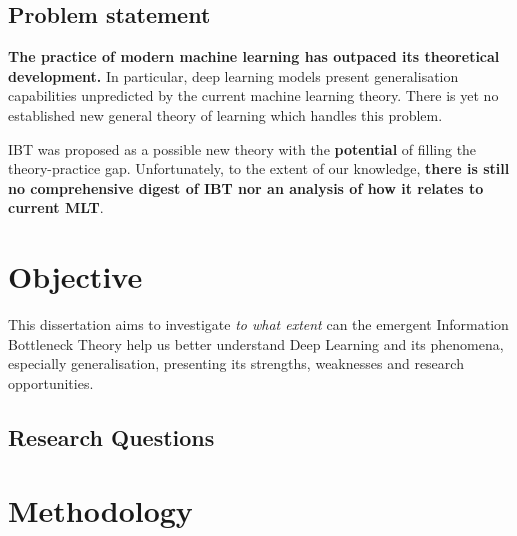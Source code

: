 \documentclass[
  letterpaper,
  a4paper,
  12pt,
  twoside,
  brazil,
  british,
  open=right]{scrbook}
\begin{document}
\hypertarget{problem-statement}{%
\subsection{Problem statement}\label{problem-statement}}

\textbf{The practice of modern machine learning has outpaced its
theoretical development.} In particular, deep learning models present
generalisation capabilities unpredicted by the current machine learning
theory. There is yet no established new general theory of learning which
handles this problem.

{IBT} was proposed as a possible new theory with the \textbf{potential}
of filling the theory-practice gap. Unfortunately, to the extent of our
knowledge, \textbf{there is still no comprehensive digest of {IBT} nor
an analysis of how it relates to current {MLT}}.

\hypertarget{objective}{%
\section{Objective}\label{objective}}

This dissertation aims to investigate \emph{to what extent} can the
emergent Information Bottleneck Theory help us better understand Deep
Learning and its phenomena, especially generalisation, presenting its
strengths, weaknesses and research opportunities.

\hypertarget{research-questions}{%
\subsection{Research Questions}\label{research-questions}}

\hypertarget{methodology}{%
\section{Methodology}\label{methodology}}
\end{document}
